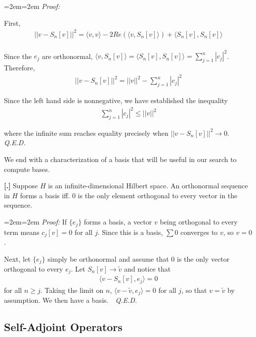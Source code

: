 \documentclass{article}
\newcommand{ \norm }[1]{{ || {#1}||}}
\newcounter{result}[section]
\newenvironment{res}[1][]{\refstepcounter{result}\par\medskip
	\noindent \textbf{[\thesection.\theresult] #1} \rmfamily}{\medskip}
\newenvironment{pf}{%
	\par%
	\medskip
	\leftskip=2em\rightskip=2em%
	\noindent\ignorespaces \textit{Proof:} \newline}{%
	\,\, \newline \textit{Q.E.D.}\par\medskip}
\begin{document}
	\begin{pf}
		
	First,
	\begin{align*}
		\norm{v - S_{n}[v]}^{2} = \langle v,v \rangle - 2 Re(\langle v,S_{n}[v] \rangle ) + \langle S_{n}[v], S_{n}[v] \rangle \\
	\end{align*}
	
	Since the $e_{j}$ are orthonormal, $\langle v,S_{n}[v] \rangle =\langle S_{n}[v], S_{n}[v] \rangle = \sum_{j=1}^{n} |c_{j}|^{2}$. Therefore, 
	\begin{align*}
		\norm{v-S_{n}[v]}^{2} = \norm{v}^{2} - \sum_{j=1}^{n} |c_{j}|^{2}
	\end{align*}
	
	Since the left hand side is nonnegative, we have established the inequality 
	\begin{align*}
		\sum_{j=1}^{n} |c_{j}|^{2} \leq \norm{v}^{2}
	\end{align*}
	
	where the infinite sum reaches equality precisely when $\norm{v-S_{n}[v]}^{2} \to 0$. 
	\end{pf}
	
	
	We end with a characterization of a basis that will be useful in our search to compute bases. 
	
	\begin{res}
		Suppose $H$ is an infinite-dimensional Hilbert space. An orthonormal sequence in $H$ forms a basis iff. $0$ is the only element orthogonal to every vector in the sequence. 
	\end{res}
	
	\begin{pf}
		If $\{e_{j}\}$ forms a basis, a vector $v$ being orthogonal to every term means $c_{j}[v] = 0$ for all $j$. Since this is a basis, $\sum 0$ converges to $v$, so $v=0$. 
		
		Next, let $\{e_{j}\}$ simply be orthonormal and assume that $0$ is the only vector orthogonal to every $e_j$. Let $S_{n}[v] \to \tilde{v}$ and notice that 
		\begin{align*}
			\langle v - S_{n}[v],e_{j} \rangle =0
		\end{align*}
		for all $n \geq j$. Taking the limit on $n$, $\langle v - \tilde{v},e_{j} \rangle  = 0$ for all $j$, so that $v = \tilde{v}$ by assumption. We then have a basis. 
	\end{pf}
	
	\subsection{Self-Adjoint Operators}
	
\end{document}
